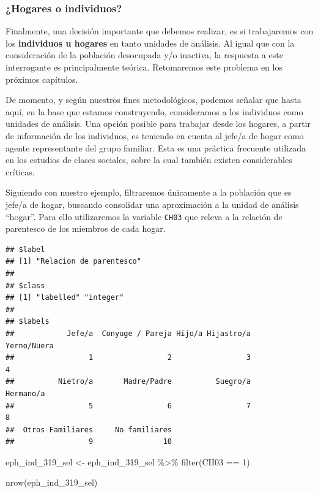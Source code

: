 \documentclass[
]{book}
\newenvironment{Shaded}{\begin{snugshade}}{\end{snugshade}}
\newcommand{\DecValTok}[1]{\textcolor[rgb]{0.00,0.00,0.81}{#1}}
\newcommand{\FunctionTok}[1]{\textcolor[rgb]{0.00,0.00,0.00}{#1}}
\newcommand{\NormalTok}[1]{#1}
\newcommand{\OtherTok}[1]{\textcolor[rgb]{0.56,0.35,0.01}{#1}}
\newcommand{\SpecialCharTok}[1]{\textcolor[rgb]{0.00,0.00,0.00}{#1}}
\begin{document}
\hypertarget{hogares-o-individuos}{%
\subsubsection{¿Hogares o individuos?}\label{hogares-o-individuos}}

Finalmente, una decisión importante que debemos realizar, es si trabajaremos con los \textbf{individuos u hogares} en tanto unidades de análisis. Al igual que con la consideración de la población desocupada y/o inactiva, la respuesta a este interrogante es principalmente teórica. Retomaremos este problema en los próximos capítulos.

De momento, y según nuestros fines metodológicos, podemos señalar que hasta aquí, en la base que estamos construyendo, consideramos a los individuos como unidades de análisis. Una opción posible para trabajar desde los hogares, a partir de información de los individuos, es teniendo en cuenta al jefe/a de hogar como agente representante del grupo familiar. Esta es una práctica frecuente utilizada en los estudios de clases sociales, sobre la cual también existen considerables críticas.

Siguiendo con nuestro ejemplo, filtraremos únicamente a la población que es jefe/a de hogar, buscando consolidar una aproximación a la unidad de análisis ``hogar''. Para ello utilizaremos la variable \texttt{CH03} que releva a la relación de parentesco de los miembros de cada hogar.

\begin{Shaded}
\end{Shaded}

\begin{verbatim}
## $label
## [1] "Relacion de parentesco"
## 
## $class
## [1] "labelled" "integer" 
## 
## $labels
##            Jefe/a  Conyuge / Pareja Hijo/a Hijastro/a       Yerno/Nuera 
##                 1                 2                 3                 4 
##          Nietro/a       Madre/Padre          Suegro/a         Hermano/a 
##                 5                 6                 7                 8 
##  Otros Familiares     No familiares 
##                 9                10
\end{verbatim}

\begin{Shaded}
\begin{Highlighting}[]
\NormalTok{eph\_ind\_319\_sel }\OtherTok{\textless{}{-}}\NormalTok{ eph\_ind\_319\_sel }\SpecialCharTok{\%\textgreater{}\%} 
    \FunctionTok{filter}\NormalTok{(CH03 }\SpecialCharTok{==} \DecValTok{1}\NormalTok{)}

\FunctionTok{nrow}\NormalTok{(eph\_ind\_319\_sel)}
\end{Highlighting}
\end{Shaded}
\end{document}
